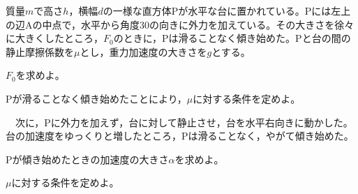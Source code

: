 \hakosyokika
\item
    \begin{mawarikomi}{80pt}{}
        質量$m$で高さ$h$，横幅$d$の一様な直方体Pが水平な台に置かれている。Pには左上の辺Aの中点で，水平から角度30\Deg の向きに外力を加えている。その大きさを徐々に大きくしたところ，$F_0$のときに，Pは滑ることなく傾き始めた。Pと台の間の静止摩擦係数を$\mu $とし，重力加速度の大きさを$g$とする。
        \begin{Enumerate}
            \item $F_0$を求めよ。
            \item Pが滑ることなく傾き始めたことにより，$\mu $に対する条件を定めよ。
        \end{Enumerate}
        ~~次に，Pに外力を加えず，台に対して静止させ，台を水平右向きに動かした。台の加速度をゆっくりと増したところ，Pは滑ることなく，やがて傾き始めた。
        \begin{Enumerate*}
            \item Pが傾き始めたときの加速度の大きさ$\alpha $を求めよ。
            \item $\mu $に対する条件を定めよ。
        \end{Enumerate*}
    \end{mawarikomi}